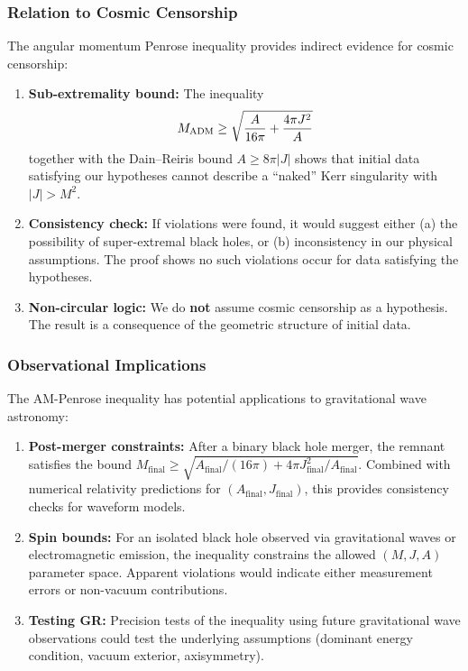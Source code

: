 \subsubsection{Relation to Cosmic Censorship}

The angular momentum Penrose inequality provides indirect evidence for cosmic censorship:

\begin{enumerate}
    \item \textbf{Sub-extremality bound:} The inequality
    \[
    M_{\mathrm{ADM}} \geq \sqrt{\frac{A}{16\pi} + \frac{4\pi J^2}{A}}
    \]
    together with the Dain--Reiris bound $A \geq 8\pi|J|$ shows that initial data satisfying our hypotheses cannot describe a ``naked'' Kerr singularity with $|J| > M^2$.
    
    \item \textbf{Consistency check:} If violations were found, it would suggest either (a) the possibility of super-extremal black holes, or (b) inconsistency in our physical assumptions. The proof shows no such violations occur for data satisfying the hypotheses.
    
    \item \textbf{Non-circular logic:} We do \textbf{not} assume cosmic censorship as a hypothesis. The result is a consequence of the geometric structure of initial data.
\end{enumerate}

\subsubsection{Observational Implications}

The AM-Penrose inequality has potential applications to gravitational wave astronomy:

\begin{enumerate}
    \item \textbf{Post-merger constraints:} After a binary black hole merger, the remnant satisfies the bound $M_{\text{final}} \geq \sqrt{A_{\text{final}}/(16\pi) + 4\pi J_{\text{final}}^2/A_{\text{final}}}$. Combined with numerical relativity predictions for $(A_{\text{final}}, J_{\text{final}})$, this provides consistency checks for waveform models.
    
    \item \textbf{Spin bounds:} For an isolated black hole observed via gravitational waves or electromagnetic emission, the inequality constrains the allowed $(M, J, A)$ parameter space. Apparent violations would indicate either measurement errors or non-vacuum contributions.
    
    \item \textbf{Testing GR:} Precision tests of the inequality using future gravitational wave observations could test the underlying assumptions (dominant energy condition, vacuum exterior, axisymmetry).
\end{enumerate}

